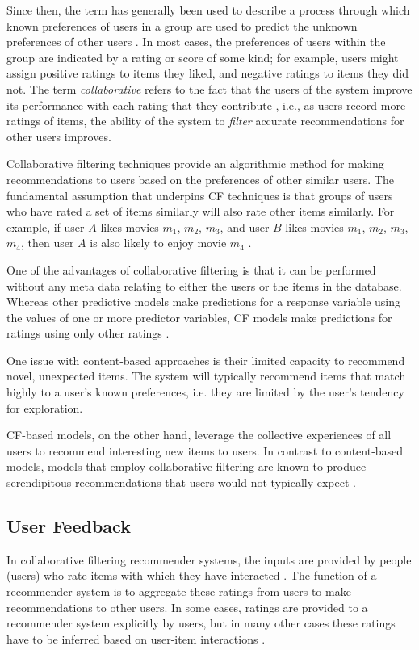 Since then, the term has generally been used to describe a process through which known preferences of users in a group are used to predict the unknown preferences of other users \parencite{cf_1.1}. In most cases, the preferences of users within the group are indicated by a rating or score of some kind; for example, users might assign positive ratings to items they liked, and negative ratings to items they did not. The term \textit{collaborative} refers to the fact that the users of the system improve its performance with each rating that they contribute \parencite{cf_1.2_eigentaste}, i.e., as users record more ratings of items, the ability of the system to \textit{filter} accurate recommendations for other users improves. 

Collaborative filtering techniques provide an algorithmic method for making recommendations to users based on the preferences of other similar users. The fundamental assumption that underpins CF techniques is that groups of users who have rated a set of items similarly will also rate other items similarly. For example, if user $A$ likes movies $m_1$, $m_2$, $m_3$, and user $B$ likes movies $m_1$, $m_2$, $m_3$, $m_4$, then user $A$ is also likely to enjoy movie $m_4$ \parencite{cf_1.1}.

One of the advantages of collaborative filtering is that it can be performed without any meta data relating to either the users or the items in the database. Whereas other predictive models make predictions for a response variable using the values of one or more predictor variables, CF models make predictions for ratings using only other ratings \parencite{handbook_1.1_intro}.

One issue with content-based approaches is their limited capacity to recommend novel, unexpected items. The system will typically recommend items that match highly to a user's known preferences, i.e. they are limited by the user's tendency for exploration. \parencite{handbook_1.3_content-based}

CF-based models, on the other hand, leverage the collective experiences of all users to recommend interesting new items to users. In contrast to content-based models, models that employ collaborative filtering are known to produce serendipitous recommendations that users would not typically expect \parencite{herlocker2002empirical}.

\subsection{User Feedback}
 In collaborative filtering recommender systems, the inputs are provided by people (users) who rate items with which they have interacted \parencite{cf_1.5_explicit}. The function of a recommender system is to aggregate these ratings from users to make recommendations to other users. In some cases, ratings are provided to a recommender system explicitly by users, but in many other cases these ratings have to be inferred based on user-item interactions \parencite{cf_1.6_implicit}. 

